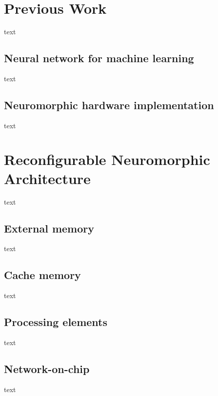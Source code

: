 \documentclass[pageno]{jpaper}
\begin{document}
\section{Previous Work}
text
\subsection{Neural network for machine learning} 
text
\subsection{Neuromorphic hardware implementation}
text

\section{Reconfigurable Neuromorphic Architecture}
text

\subsection{External memory}
text
\subsection{Cache memory}
text
\subsection{Processing elements}
text
\subsection{Network-on-chip}
text





\end{document}
